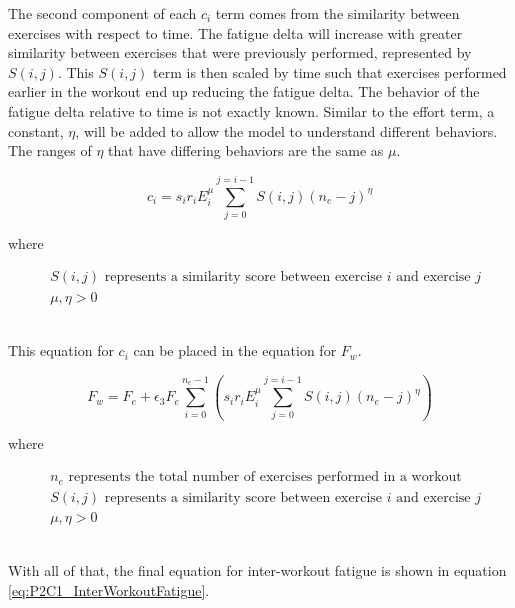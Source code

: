The second component of each $c_i$ term comes from the similarity between exercises with respect to time. The fatigue delta will increase with greater similarity between exercises that were previously performed, represented by $S(i,j)$. This $S(i,j)$ term is then scaled by time such that exercises performed earlier in the workout end up reducing the fatigue delta. The behavior of the fatigue delta relative to time is not exactly known. Similar to the effort term, a constant, $\eta$, will be added to allow the model to understand different behaviors. The ranges of $\eta$ that have differing behaviors are the same as $\mu$.

\begin{minipage}{\textwidth}
	\begin{equation*}
		c_i=s_i r_i E_i^\mu \sum_{j=0}^{j=i-1} S(i,j)(n_e-j)^\eta
	\end{equation*}
	\centerline{where}
	\begin{equation*}
		\begin{split}
			& S(i,j) \text{ represents a similarity score between exercise }i \text{ and exercise }j \\
			& \mu, \eta>0
		\end{split}
	\end{equation*}
\end{minipage}\\

This equation for $c_i$ can be placed in the equation for $F_w$.

\begin{minipage}{\textwidth}
	\begin{equation*}
		F_w =
			F_{e} + 
			\epsilon_3 F_e 
			\sum_{i=0}^{n_e-1} \left( 
				s_i r_i E_i^\mu 
				\sum_{j=0}^{j=i-1} S(i,j)(n_e-j)^\eta
			\right)
	\end{equation*}
	\centerline{where}
	\begin{equation*}
		\begin{split}
			& n_e \text{ represents the total number of exercises performed in a workout} \\
			& S(i,j) \text{ represents a similarity score between exercise }i \text{ and exercise }j \\
			& \mu, \eta>0
		\end{split}
	\end{equation*}
\end{minipage}\\

With all of that, the final equation for inter-workout fatigue is shown in equation \ref{eq:P2C1_InterWorkoutFatigue}.

